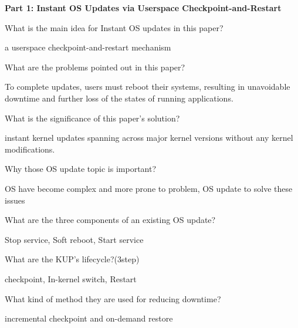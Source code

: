 \documentclass[addpoints, answers,  10pt]{exam}
\begin{document}
\pagestyle{headandfoot}
\firstpagefooter{}{}{}
\firstpageheadrule
\runningheadrule

\hfill {}

\boxedpoints
{\bfseries Part 1: Instant OS Updates via Userspace Checkpoint-and-Restart }

\begin{questions}


\question What is the main idea for Instant OS updates in this paper?
\begin{solutionorlines}[2cm]
 a userspace checkpoint-and-restart mechanism
\end{solutionorlines}


\question What are the problems pointed out in this paper?
\begin{solutionorlines}[2cm]
 To complete  updates, users must reboot their systems, resulting in unavoidable downtime and further loss of the states of running applications. 
\end{solutionorlines}


\question What is the significance of this paper's solution?
\begin{solutionorlines}[2cm]
 instant kernel updates spanning across major kernel versions without any kernel modifications. 
\end{solutionorlines}



\question Why those OS update topic is important? 
\begin{solutionorlines}[2cm]
 OS have become complex and more prone to problem, OS update to solve these issues 
\end{solutionorlines}


\question What are the three components of an existing OS update?
\begin{solutionorlines}[2cm]
 Stop service, Soft reboot, Start service
\end{solutionorlines}


\question What are the KUP’s lifecycle?(3step)
\begin{solutionorlines}[2cm]
 checkpoint, In-kernel switch, Restart
\end{solutionorlines}


\question What kind of method they are used for reducing downtime?
\begin{solutionorlines}[2cm]
 incremental checkpoint and on-demand restore
\end{solutionorlines}




\end{questions}
\end{document}
